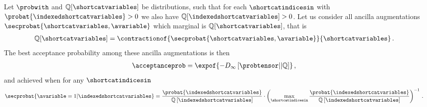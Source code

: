 \begin{theorem}
    Let $\probwith$ and $\mathbb{Q}[\shortcatvariables]$ be distributions, such that for each $\shortcatindicesin$ with $\probat{\indexedshortcatvariables}>0$ we also have $\mathbb{Q}[\indexedshortcatvariables]>0$.
    Let us consider all ancilla augmentations $\secprobat{\shortcatvariables,\avariable}$ which marginal is $\mathbb{Q}[\shortcatvariables]$, that is
    \begin{align*}
        \mathbb{Q}[\shortcatvariables]
        = \contractionof{\secprobat{\shortcatvariables,\avariable}}{\shortcatvariables} \, .
    \end{align*}
    The best acceptance probability among these ancilla augmentations is then
    \begin{align*}
        \acceptanceprob
        = \expof{-D_{\infty}\left[\probtensor||\mathbb{Q}\right]} \, ,
    \end{align*}
    and achieved when for any $\shortcatindicesin$
    \begin{align*}
        \secprobat{\avariable=1|\indexedshortcatvariables}
        = \frac{
            \probat{\indexedshortcatvariables}}{\mathbb{Q}\left[\indexedshortcatvariables\right]
        } \cdot \left(\max_{\shortcatindicesin}\frac{\probat{\indexedshortcatvariables}}{\mathbb{Q}\left[\indexedshortcatvariables\right]}
        \right)^{-1} \, .
    \end{align*}
\end{theorem}
